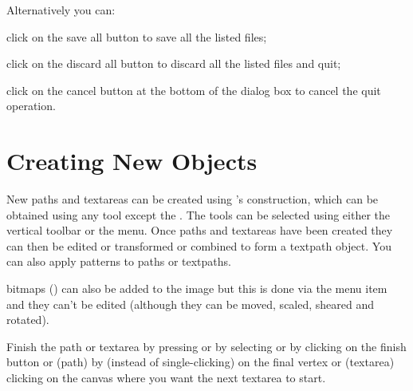 Alternatively you can:
\begin{deflist}

\begin{itemdesc}
click on the save all button to save all the listed files;
\end{itemdesc}


\begin{itemdesc}
click on the discard all button to discard all the listed files and
quit;
\end{itemdesc}


\begin{itemdesc}
click on the cancel button at the bottom of the dialog box to cancel
the quit operation.
\end{itemdesc}

\end{deflist}

\chapter{Creating New Objects}\label{sec:newobjects}


New \glspl{path} and \glspl{textarea} can be created using
\FlowframTk's \gls{construction}, which can be obtained using any tool
except the . The tools can be selected using either the
vertical \gls{toolbar} or the  menu. Once \glspl{path}
and \glspl{textarea} have been created they can then be edited or
transformed or combined to form a \gls{textpath} object. You can
also apply patterns to \glspl{path} or \glspl{textpath}.

\Glspl{bitmap} () can also be added to
the image but this is done via the  menu item
and they can't be edited (although they can be moved, scaled,
sheared and rotated).


Finish the \gls{path} or \gls{textarea} by pressing
 or by selecting 
or by clicking on the finish button or (\gls{path}) by
 (instead of single-clicking)
on the final vertex or (\gls{textarea}) clicking on the \gls{canvas}
where you want the next \gls{textarea} to start.  

